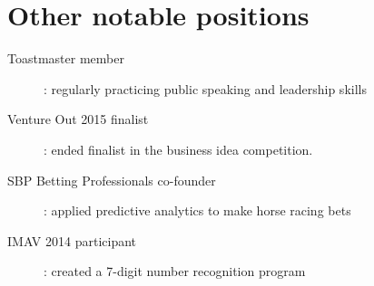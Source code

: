 \documentclass[10pt]{CurriculumVitae}
\begin{document}
  \section{Other notable positions}
    \begin{description}
       \item[Toastmaster member]: regularly practicing public speaking and leadership skills
       \item[Venture Out 2015 finalist]: ended finalist in the business idea competition.
       \item[SBP Betting Professionals co-founder]: applied predictive analytics to make horse racing bets 
       \item[IMAV 2014 participant]:  created a 7-digit number recognition program 
    \end{description}
\end{document}
